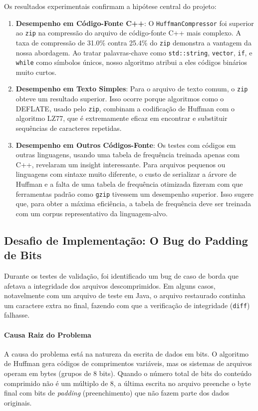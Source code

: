 \documentclass[12pt, a4paper]{article}
\begin{document}
Os resultados experimentais confirmam a hipótese central do projeto:
\begin{enumerate}
    \item \textbf{Desempenho em Código-Fonte C++}: O \texttt{HuffmanCompressor} foi superior ao \texttt{zip} na compressão do arquivo de código-fonte C++ mais complexo. A taxa de compressão de 31.0\% contra 25.4\% do \texttt{zip} demonstra a vantagem da nossa abordagem. Ao tratar palavras-chave como \texttt{std::string}, \texttt{vector}, \texttt{if}, e \texttt{while} como símbolos únicos, nosso algoritmo atribui a eles códigos binários muito curtos.
    
    \item \textbf{Desempenho em Texto Simples}: Para o arquivo de texto comum, o \texttt{zip} obteve um resultado superior. Isso ocorre porque algoritmos como o DEFLATE, usado pelo \texttt{zip}, combinam a codificação de Huffman com o algoritmo LZ77, que é extremamente eficaz em encontrar e substituir sequências de caracteres repetidas.
    
    \item \textbf{Desempenho em Outros Códigos-Fonte}: Os testes com códigos em outras linguagens, usando uma tabela de frequência treinada apenas com C++, revelaram um insight interessante. Para arquivos pequenos ou linguagens com sintaxe muito diferente, o custo de serializar a árvore de Huffman e a falta de uma tabela de frequência otimizada fizeram com que ferramentas padrão como \texttt{gzip} tivessem um desempenho superior. Isso sugere que, para obter a máxima eficiência, a tabela de frequência deve ser treinada com um corpus representativo da linguagem-alvo.
\end{enumerate}

\subsection{Desafio de Implementação: O Bug do Padding de Bits}

Durante os testes de validação, foi identificado um bug de caso de borda que afetava a integridade dos arquivos descomprimidos. Em alguns casos, notavelmente com um arquivo de teste em Java, o arquivo restaurado continha um caractere extra no final, fazendo com que a verificação de integridade (\texttt{diff}) falhasse.

\paragraph{Causa Raiz do Problema}
A causa do problema está na natureza da escrita de dados em bits. O algoritmo de Huffman gera códigos de comprimentos variáveis, mas os sistemas de arquivos operam em bytes (grupos de 8 bits). Quando o número total de bits do conteúdo comprimido não é um múltiplo de 8, a última escrita no arquivo preenche o byte final com bits de \textit{padding} (preenchimento) que não fazem parte dos dados originais.
\end{document}
